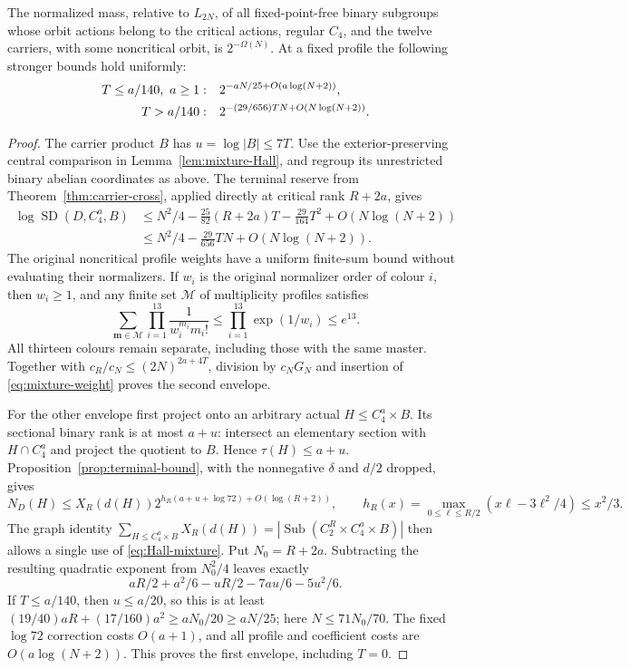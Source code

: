 \begin{theorem}\label{thm:binary-mixture}
The normalized mass, relative to $L_{2N}$, of all fixed-point-free
binary subgroups whose orbit actions belong to the critical actions,
regular $C_4$, and the twelve carriers, with some noncritical orbit,
is $2^{-\Omega(N)}$. At a fixed profile the following stronger
bounds hold uniformly:
\begin{align}\label{eq:proved-mixture-envelopes}
 T\leq a/140,\ a\geq1:&\quad
 2^{-aN/25+O(a\log(N+2))},\notag\\
 T>a/140:&\quad
 2^{-(29/656)TN+O(N\log(N+2))}.
\end{align}
\end{theorem}
\begin{proof}
The carrier product $B$ has $u=\log|B|\leq7T$. Use the
exterior-preserving central comparison in Lemma~\ref{lem:mixture-Hall},
and regroup its unrestricted binary abelian coordinates as above.
The terminal reserve from Theorem~\ref{thm:carrier-cross}, applied
directly at critical rank $R+2a$, gives
\[
 \begin{aligned}
 \log\operatorname{SD}(D,C_4^a,B)
 &\leq N^2/4-\frac{25}{82}(R+2a)T-\frac{29}{164}T^2
                  +O(N\log(N+2))\\
 &\leq N^2/4-\frac{29}{656}TN+O(N\log(N+2)).
 \end{aligned}
\]
The original noncritical profile weights have a uniform finite-sum
bound without evaluating their normalizers. If $w_i$ is the original
normalizer order of colour $i$, then $w_i\geq1$, and any finite set
$\mathcal M$ of multiplicity profiles satisfies
\[
 \sum_{\mathbf m\in\mathcal M}
    \prod_{i=1}^{13}\frac1{w_i^{m_i}m_i!}
 \leq\prod_{i=1}^{13}\exp(1/w_i)\leq e^{13}.
\]
All thirteen colours remain separate, including those with the same
master. Together with $c_R/c_N\leq(2N)^{2a+4T}$, division by $c_NG_N$
and insertion of \eqref{eq:mixture-weight} proves the second envelope.

For the other envelope first project onto an arbitrary actual
$H\leq C_4^a\times B$. Its sectional binary rank is at most $a+u$:
intersect an elementary section with $H\cap C_4^a$ and project the
quotient to $B$. Hence $\tau(H)\leq a+u$.
Proposition~\ref{prop:terminal-bound}, with the nonnegative $\delta$
and $d/2$ dropped, gives
\[
 N_D(H)\leq X_R(d(H))
 2^{h_R(a+u+\log72)+O(\log(R+2))},\qquad
 h_R(x)=\max_{0\leq\ell\leq R/2}(x\ell-3\ell^2/4)\leq x^2/3.
\]
The graph identity
$\sum_{H\leq C_4^a\times B}X_R(d(H))
=|\operatorname{Sub}(C_2^R\times C_4^a\times B)|$
then allows a single use of \eqref{eq:Hall-mixture}.
Put $N_0=R+2a$. Subtracting the resulting quadratic exponent from
$N_0^2/4$ leaves exactly
\[
 aR/2+a^2/6-uR/2-7au/6-5u^2/6.
\]
If $T\leq a/140$, then $u\leq a/20$, so this is at least
$(19/40)aR+(17/160)a^2\geq aN_0/20\geq aN/25$;
here $N\leq71N_0/70$. The fixed $\log72$ correction costs $O(a+1)$,
and all profile and coefficient costs are $O(a\log(N+2))$.
This proves the first envelope, including $T=0$.


\end{proof}
